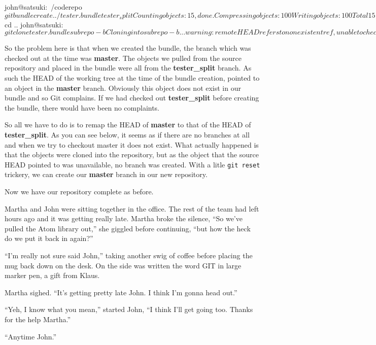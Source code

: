 \begin{code}
john@satsuki:~/coderepo$ git bundle create ../tester.bundle tester_split 
Counting objects: 15, done.
Compressing objects: 100%
Writing objects: 100%
Total 15 (delta 3), reused 0 (delta 0)
john@satsuki:~/coderepo$ cd ..
john@satsuki:~$ git clone tester.bundle subrepo-b
Cloning into subrepo-b...
warning: remote HEAD refers to nonexistent ref, unable to checkout.

john@satsuki:~$
\end{code}

So the problem here is that when we created the bundle, the branch which was checked out at the time was \textbf{master}.
The objects we pulled from the source repository and placed in the bundle were all from the \textbf{tester\_split} branch.
As such the HEAD of the working tree at the time of the bundle creation, pointed to an object in the \textbf{master} branch.
Obviously this object does not exist in our bundle and so Git complains.
If we had checked out \textbf{tester\_split} before creating the bundle, there would have been no complaints.

So all we have to do is to remap the HEAD of \textbf{master} to that of the HEAD of \textbf{tester\_split}.
As you can see below, it seems as if there are no branches at all and when we try to checkout master it does not exist.
What actually happened is that the objects were cloned into the repository, but as the object that the source HEAD pointed to was unavailable,
no branch was created.
With a litle \texttt{git reset} trickery, we can create our \textbf{master} branch in our new repository.


Now we have our repository complete as before.

\begin{trenches}
Martha and John were sitting together in the office.
The rest of the team had left hours ago and it was getting really late.
Martha broke the silence, ``So we've pulled the Atom library out,'' she giggled before continuing, ``but how the heck do we put it back in again?''

``I'm really not sure said John,'' taking another swig of coffee before placing the mug back down on the desk.
On the side was written the word GIT in large marker pen, a gift from Klaus.

Martha sighed. ``It's getting pretty late John. I think I'm gonna head out.''

``Yeh, I know what you mean,'' started John, ``I think I'll get going too.
Thanks for the help Martha.''

``Anytime John.''
\end{trenches}


